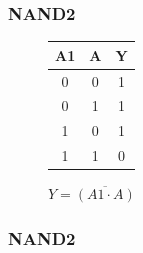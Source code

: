 \documentclass[aspectratio=169]{beamer}
\begin{document}
\begin{frame}
\frametitle{NAND2}
    \begin{figure}[h]
        \begin{center}
            \begin{circuitdiagram}{11}{6}
                \usgate
            \end{circuitdiagram}
            \hspace{2cm}
            \begin{tabular}{ c c|c } 
                A1 & A & Y \\ 
                \hline
                0 & 0 & 1 \\ 
                0 & 1 & 1 \\ 
                1 & 0 & 1 \\ 
                1 & 1 & 0 \\ 
            \end{tabular}
        \end{center}
    $Y = \overline{ (A1 \cdot A) }$
    \end{figure}
\end{frame}

\begin{frame}
\frametitle{NAND2}
    \begin{figure}[h]
        \begin{center}
            \begin{circuitdiagram}{18}{20}
            \end{circuitdiagram}
        \end{center}
    \end{figure}
\end{frame}

\end{document}
